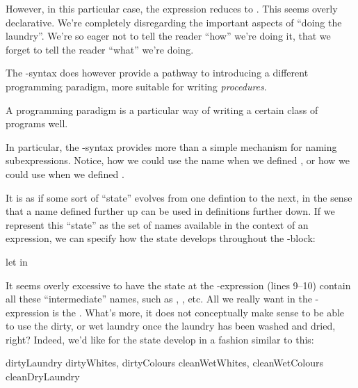 However, in this particular case, the expression reduces to . This seems overly declarative. We're completely disregarding the
important aspects of ``doing the laundry''. We're so eager not to tell the
reader ``how'' we're doing it, that we forget to tell the reader ``what'' we're
doing.

The -syntax does however provide a pathway to introducing a different
programming paradigm, more suitable for writing \emph{procedures}.

\begin{definition}

A programming paradigm is a particular way of writing a certain class of
programs well.

\end{definition}

In particular,
the -syntax provides more than a simple mechanism for naming
subexpressions. Notice, how we could use the name  when we
defined , or how we could use  when we
defined .

It is as if some sort of ``state'' evolves from one defintion to the next, in
the sense that a name defined further up can be used in definitions further
down. If we represent this ``state'' as the set of names available in the
context of an expression, we can specify how the state develops throughout the
-block: 

\begin{codebox}
\li let
\li in
\end{codebox}

It seems overly excessive to have the state at the -expression (lines
9--10) contain all these ``intermediate'' names, such as ,
, etc. All we really want in the -expression is
the . What's more, it does not conceptually make sense to be
able to use the dirty, or wet laundry once the laundry has been washed and
dried, right? Indeed, we'd like for the state develop in a fashion similar to
this:

\begin{code}
{dirtyLaundry}
{dirtyWhites, dirtyColours}
{cleanWetWhites, cleanWetColours}
{cleanDryLaundry}
\end{code}

